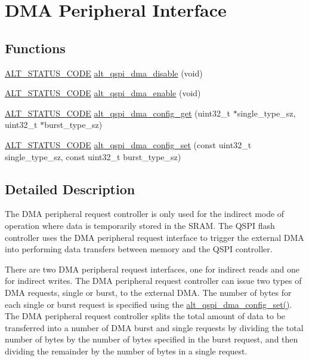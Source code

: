 \hypertarget{group__ALT__QSPI__DMA}{}\section{D\+MA Peripheral Interface}
\label{group__ALT__QSPI__DMA}
\subsection*{Functions}
\begin{DoxyCompactItemize}
\item 
\mbox{\hyperlink{hwlib_8h_abdb0d369f069723ca55d6c94bcaaaa12}{A\+L\+T\+\_\+\+S\+T\+A\+T\+U\+S\+\_\+\+C\+O\+DE}} \mbox{\hyperlink{group__ALT__QSPI__DMA_ga4d16f0e1e367185438c882b1e54ad69a}{alt\+\_\+qspi\+\_\+dma\+\_\+disable}} (void)
\item 
\mbox{\hyperlink{hwlib_8h_abdb0d369f069723ca55d6c94bcaaaa12}{A\+L\+T\+\_\+\+S\+T\+A\+T\+U\+S\+\_\+\+C\+O\+DE}} \mbox{\hyperlink{group__ALT__QSPI__DMA_gab7335b92adfb09af82a3e7e92e2c1765}{alt\+\_\+qspi\+\_\+dma\+\_\+enable}} (void)
\item 
\mbox{\hyperlink{hwlib_8h_abdb0d369f069723ca55d6c94bcaaaa12}{A\+L\+T\+\_\+\+S\+T\+A\+T\+U\+S\+\_\+\+C\+O\+DE}} \mbox{\hyperlink{group__ALT__QSPI__DMA_ga92ee264b9fe98d0acfabe3c0ac2d9d1b}{alt\+\_\+qspi\+\_\+dma\+\_\+config\+\_\+get}} (uint32\+\_\+t $\ast$single\+\_\+type\+\_\+sz, uint32\+\_\+t $\ast$burst\+\_\+type\+\_\+sz)
\item 
\mbox{\hyperlink{hwlib_8h_abdb0d369f069723ca55d6c94bcaaaa12}{A\+L\+T\+\_\+\+S\+T\+A\+T\+U\+S\+\_\+\+C\+O\+DE}} \mbox{\hyperlink{group__ALT__QSPI__DMA_ga6544a397843d6b1204f500be26896878}{alt\+\_\+qspi\+\_\+dma\+\_\+config\+\_\+set}} (const uint32\+\_\+t single\+\_\+type\+\_\+sz, const uint32\+\_\+t burst\+\_\+type\+\_\+sz)
\end{DoxyCompactItemize}


\subsection{Detailed Description}
The D\+MA peripheral request controller is only used for the indirect mode of operation where data is temporarily stored in the S\+R\+AM. The Q\+S\+PI flash controller uses the D\+MA peripheral request interface to trigger the external D\+MA into performing data transfers between memory and the Q\+S\+PI controller.

There are two D\+MA peripheral request interfaces, one for indirect reads and one for indirect writes. The D\+MA peripheral request controller can issue two types of D\+MA requests, single or burst, to the external D\+MA. The number of bytes for each single or burst request is specified using the \mbox{\hyperlink{group__ALT__QSPI__DMA_ga6544a397843d6b1204f500be26896878}{alt\+\_\+qspi\+\_\+dma\+\_\+config\+\_\+set()}}. The D\+MA peripheral request controller splits the total amount of data to be transferred into a number of D\+MA burst and single requests by dividing the total number of bytes by the number of bytes specified in the burst request, and then dividing the remainder by the number of bytes in a single request.

